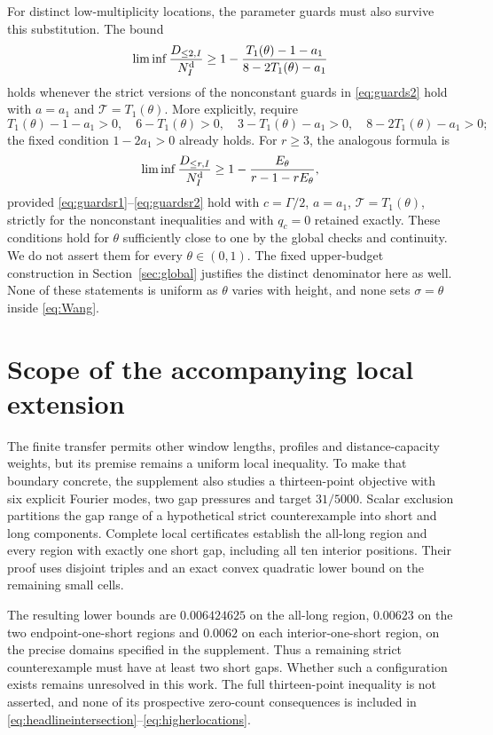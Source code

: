 \documentclass[11pt]{amsart}
\numberwithin{equation}{section}
\newcommand{\Nd}{N^{\rm d}}
\begin{document}
For distinct low-multiplicity locations, the parameter guards must
also survive this substitution. The bound
\begin{equation}
 \liminf\frac{D_{\le2,I}}{\Nd_I}\ge
 1-\frac{T_1(\theta)-1-a_1}{8-2T_1(\theta)-a_1}
 \label{eq:shortdistinct2}
\end{equation}
holds whenever the strict versions of the nonconstant guards in
\eqref{eq:guards2} hold with $a=a_1$ and
$\mathcal T=T_1(\theta)$. More explicitly, require
\[
 T_1(\theta)-1-a_1>0,\quad 6-T_1(\theta)>0,\quad
 3-T_1(\theta)-a_1>0,\quad8-2T_1(\theta)-a_1>0;
\]
the fixed condition $1-2a_1>0$ already holds.
For $r\ge3$, the analogous formula is
\begin{equation}
 \liminf\frac{D_{\le r,I}}{\Nd_I}\ge
           1-\frac{E_\theta}{r-1-rE_\theta},\label{eq:shortdistinctr}
\end{equation}
provided \eqref{eq:guardsr1}--\eqref{eq:guardsr2} hold with
$c=\Gamma/2$, $a=a_1$, $\mathcal T=T_1(\theta)$, strictly for
the nonconstant inequalities and with $q_c=0$ retained exactly.
These conditions hold for $\theta$ sufficiently close to one by
the global checks and continuity. We do not assert them for every
$\theta\in(0,1)$. The fixed upper-budget construction in
Section~\ref{sec:global} justifies the distinct denominator here
as well. None of these statements is uniform as $\theta$ varies
with height, and none sets $\sigma=\theta$ inside
\eqref{eq:Wang}.

\section{Scope of the accompanying local extension}
\label{sec:scope}

The finite transfer permits other window lengths, profiles and
distance-capacity weights, but its premise remains a uniform local
inequality. To make that boundary concrete, the supplement also
studies a thirteen-point objective with six explicit Fourier modes,
two gap pressures and target $31/5000$. Scalar exclusion partitions
the gap range of a hypothetical strict counterexample into short
and long components. Complete local certificates establish the
all-long region and every region with exactly one short gap,
including all ten interior positions. Their proof uses disjoint
triples and an exact convex quadratic lower bound on the remaining
small cells.

The resulting lower bounds are $0.006424625$ on the all-long
region, $0.00623$ on the two endpoint-one-short regions and
$0.0062$ on each interior-one-short region, on the precise domains
specified in the supplement. Thus a remaining strict counterexample
must have at least two short gaps. Whether such a configuration
exists remains unresolved in this work. The full thirteen-point inequality is not
asserted, and none of its prospective zero-count consequences is
included in \eqref{eq:headlineintersection}--\eqref{eq:higherlocations}.
\end{document}
